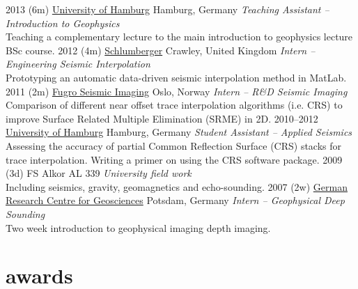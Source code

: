 \documentclass[]{friggeri-cv} %
\begin{document}
\begin{entrylist}
\entry
{2013 (6m)}
{\href{http://www.uni-hamburg.de}{University of Hamburg}}
{Hamburg, Germany}
{\emph{Teaching Assistant -- Introduction to Geophysics} \\
Teaching a complementary lecture to the main introduction to geophysics lecture BSc course.}
\entry
{2012 (4m)}
{\href{http://www.slb.com}{Schlumberger}}
{Crawley, United Kingdom}
{\emph{Intern -- Engineering Seismic Interpolation} \\
Prototyping an automatic data-driven seismic interpolation method in MatLab.}
\entry
{2011 (2m)}
{\href{http://www.fugro.no/home/companies/fsi/downloads/fsi_oslo_company_profile}{Fugro Seismic Imaging}}
{Oslo, Norway}
{\emph{Intern -- R\&D Seismic Imaging} \\
Comparison of different near offset trace interpolation algorithms (i.e. CRS) to improve Surface Related Multiple Elimination (SRME) in 2D.}
\entry
{2010--2012}
{\href{http://www.uni-hamburg.de}{University of Hamburg}}
{Hamburg, Germany}
{\emph{Student Assistant -- Applied Seismics} \\
Assessing the accuracy of partial Common Reflection Surface (CRS) stacks for trace interpolation. Writing a primer on using the CRS software package.}
\entry
{2009 (3d)}
{FS Alkor}
{AL 339}
{\emph{University field work}\\
Including seismics, gravity, geomagnetics and echo-sounding.}
\entry
{2007 (2w)}
{\href{http://www.gfz-potsdam.de}{German Research Centre for Geosciences}}
{Potsdam, Germany}
{\emph{Intern -- Geophysical Deep Sounding} \\
Two week introduction to geophysical imaging depth imaging.}
\end{entrylist}


\section{awards}
\end{document}
